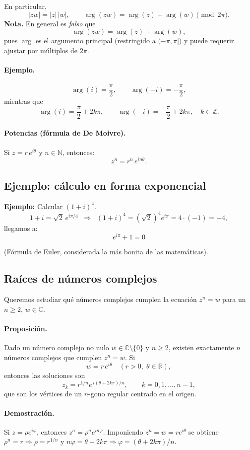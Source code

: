 \documentclass[a4paper,12pt]{article}
\begin{document}
En particular,
\[
|zw|=|z|\,|w|, \qquad \arg(zw)=\arg(z)+\arg(w)\pmod{2\pi}.
\]
\textbf{Nota.} En general es \emph{falso} que
\[
\arg(zw)=\arg(z)+\arg(w),
\]
pues \(\arg\) es el argumento principal (restringido a \((-\pi,\pi]\)) y puede requerir ajustar por múltiplos de \(2\pi\).

\paragraph{Ejemplo.}
\[
\arg(i)=\frac{\pi}{2}, \qquad \arg(-i)=-\frac{\pi}{2},
\]
mientras que
\[
\arg(i)=\frac{\pi}{2}+2k\pi, \qquad \arg(-i)=-\frac{\pi}{2}+2k\pi, \quad k\in\mathbb{Z}.
\]

\paragraph{Potencias (fórmula de De Moivre).}
Si \(z=r\,e^{i\theta}\) y \(n\in\mathbb{N}\), entonces:
\[
z^n=r^n\,e^{in\theta}.
\]

\subsection{Ejemplo: cálculo en forma exponencial}
\noindent\textbf{Ejemplo:} Calcular \((1+i)^4\).
\[
1+i=\sqrt{2}\,e^{i\pi/4}\;\;\Rightarrow\;\;(1+i)^4=(\sqrt{2})^4e^{i\pi}=4\cdot(-1)=-4,
\]
llegamos a:
\[
e^{i\pi}+1=0
\]

\medskip
{\small (Fórmula de Euler, considerada la más bonita de las matemáticas).}

\subsection{Raíces de números complejos}\label{subsec:raices}
Queremos estudiar qué números complejos cumplen la ecuación \(z^n=w\) para un \(n\ge 2\), \(w\in\mathbb{C}\).

\paragraph{Proposición.}
Dado un número complejo no nulo \(w\in\mathbb{C}\setminus\{0\}\) y \(n\ge 2\), existen exactamente \(n\) números complejos que cumplen \(z^n=w\). Si
\[
w=r\,e^{i\theta}\quad (r>0,\;\theta\in\mathbb{R}),
\]
entonces las soluciones son
\[
z_k=r^{1/n}e^{\,i(\theta+2k\pi)/n},\qquad k=0,1,\dots,n-1,
\]
que son los vértices de un \(n\)-gono regular centrado en el origen.

\paragraph{Demostración.}
Si \(z=\rho e^{i\varphi}\), entonces \(z^n=\rho^n e^{in\varphi}\).
Imponiendo \(z^n=w=r e^{i\theta}\) se obtiene \(\rho^n=r\Rightarrow \rho=r^{1/n}\) y
\(n\varphi=\theta+2k\pi\Rightarrow \varphi=(\theta+2k\pi)/n\).
\end{document}
